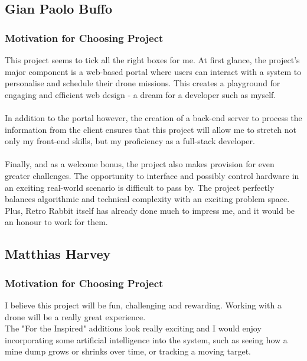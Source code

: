 \documentclass{article}
\begin{document}
	\cleardoublepage	

\subsection{Gian Paolo Buffo}

\subsubsection{Motivation for Choosing Project}
This project seems to tick all the right boxes for me. At first glance, the project's major component is a web-based portal where users can interact with a system to personalise and schedule their drone missions. This creates a playground for engaging and efficient web design - a dream for a developer such as myself.
\\\\
In addition to the portal however, the creation of a back-end server to process the information from the client ensures that this project will allow me to stretch not only my front-end skills, but my proficiency as a full-stack developer.
\\\\
Finally, and as a welcome bonus, the project also makes provision for even greater challenges. The opportunity to interface and possibly control hardware in an exciting real-world scenario is difficult to pass by. The project perfectly balances algorithmic and technical complexity with an exciting problem space. Plus, Retro Rabbit itself has already done much to impress me, and it would be an honour to work for them.    

\cleardoublepage

\subsection{Matthias Harvey}

\subsubsection{Motivation for Choosing Project}
I believe this project will be fun, challenging and rewarding. Working with a drone will be a really great experience.\\

The "For the Inspired" additions look really exciting and I would enjoy incorporating some artificial intelligence into the system, such as seeing how a mine dump grows or shrinks over time, or tracking a moving target.
\end{document}
